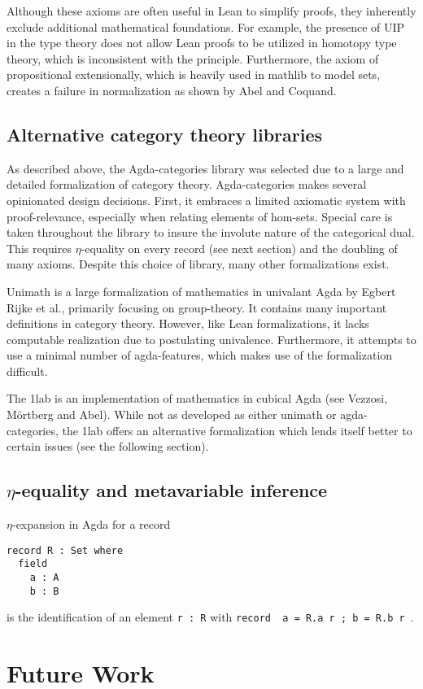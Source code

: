 \documentclass{amsart}
\theoremstyle{remark}
\begin{document}
Although these axioms are often useful in Lean to simplify proofs, they inherently exclude additional mathematical foundations. For example, the presence of UIP in the type theory does not allow Lean proofs to be utilized in homotopy type theory, which is inconsistent with the principle\cite{hottbook}. Furthermore, the axiom of propositional extensionally, which is heavily used in mathlib to model sets, creates a failure in normalization as shown by Abel and Coquand\cite{lean-normalization}.

\subsection{Alternative category theory libraries}

As described above, the Agda-categories\cite{agda:categories} library was selected due to a large and detailed formalization of category theory. Agda-categories makes several opinionated design decisions. First, it embraces a limited axiomatic system with proof-relevance, especially when relating elements of hom-sets. Special care is taken throughout the library to insure the involute nature of the categorical dual. This requires $\eta$-equality on every record (see next section) and the doubling of many axioms.
Despite this choice of library, many other formalizations exist.

Unimath\cite{agda:unimath} is a large formalization of mathematics in univalant Agda by Egbert Rijke et al., primarily focusing on group-theory. It contains many important definitions in category theory. However, like Lean formalizations, it lacks computable realization due to postulating univalence. Furthermore, it attempts to use a minimal number of agda-features, which makes use of the formalization difficult.

The 1lab\cite{agda:1lab} is an implementation of mathematics in cubical Agda (see Vezzosi, M\"{o}rtberg and Abel\cite{agda:cubical}). While not as developed as either unimath or agda-categories, the 1lab offers an alternative formalization which lends itself better to certain issues (see the following section).

\subsection{$\eta$-equality and metavariable inference}
$\eta$-expansion in Agda for a record
\begin{verbatim}
record R : Set where
  field
    a : A
    b : B
\end{verbatim}
is the identification of an element \texttt{r : R} with \texttt{record { a = R.a r ; b = R.b r }}.


\section{Future Work}
\blindtext

\printbibliography
\end{document}
